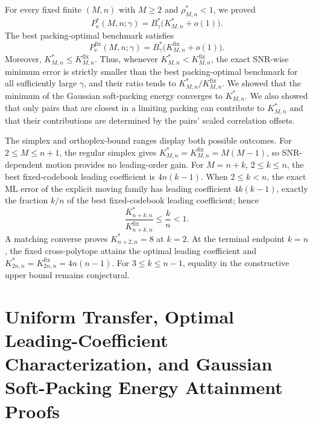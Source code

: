 \documentclass[12pt,draftclsnofoot,onecolumn]{IEEEtran}
\newcommand{\Pe}{P_{\mathrm e}}
\theoremstyle{definition}
\begin{document}
For every fixed finite \((M,n)\) with \(M\ge2\) and
\(\rho^{\ast}_{M,n}<1\), we proved
\begin{equation*}
  \Pe^{\ast}(M,n;\gamma)
  =B_\gamma^{\ast}\bigl(K^{\ast}_{M,n}+o(1)\bigr).
\end{equation*}
The best packing-optimal benchmark satisfies
\begin{equation*}
  \Pe^{\mathrm{fix}}(M,n;\gamma)
  =B_\gamma^{\ast}\bigl(K^{\mathrm{fix}}_{M,n}+o(1)\bigr).
\end{equation*}
Moreover, \(K^{\ast}_{M,n}\leq K^{\mathrm{fix}}_{M,n}\).  Thus, whenever
\(K^{\ast}_{M,n}<K^{\mathrm{fix}}_{M,n}\), the exact SNR-wise minimum
error is strictly smaller than the best packing-optimal benchmark for all
sufficiently large \(\gamma\), and their ratio tends to
\(K^{\ast}_{M,n}/K^{\mathrm{fix}}_{M,n}\).  We showed that the minimum of the Gaussian soft-packing
energy converges to \(K^{\ast}_{M,n}\).  We also showed that only pairs that are closest in a limiting packing can
contribute to \(K^{\ast}_{M,n}\) and that their contributions are determined by
the pairs' scaled correlation offsets.

The simplex and orthoplex-bound ranges display both possible outcomes.  For
\(2\leq M\leq n+1\), the regular simplex gives
\(K^{\ast}_{M,n}=K^{\mathrm{fix}}_{M,n}=M(M-1)\), so SNR-dependent motion
provides no leading-order gain.  For \(M=n+k\), \(2\leq k\leq n\), the
best fixed-codebook leading coefficient is \(4n(k-1)\).  When
\(2\leq k<n\), the exact ML error of the explicit moving family has
leading coefficient \(4k(k-1)\), exactly the fraction \(k/n\) of the
best fixed-codebook leading coefficient; hence
\begin{equation*}
  \frac{K^{\ast}_{n+k,n}}{K^{\mathrm{fix}}_{n+k,n}}
  \leq\frac{k}{n}<1.
\end{equation*}
A matching converse proves
\(K^{\ast}_{n+2,n}=8\) at \(k=2\).  At the terminal endpoint \(k=n\), the
fixed cross-polytope attains the optimal leading coefficient and
\(K^{\ast}_{2n,n}=K^{\mathrm{fix}}_{2n,n}=4n(n-1)\).  For
\(3\leq k\leq n-1\), equality in the constructive upper bound remains
conjectural.

 

\appendices


\section{Uniform Transfer, Optimal Leading-Coefficient Characterization, and
Gaussian Soft-Packing Energy Attainment Proofs}
\label{app:global-optimization-proofs}
\end{document}
